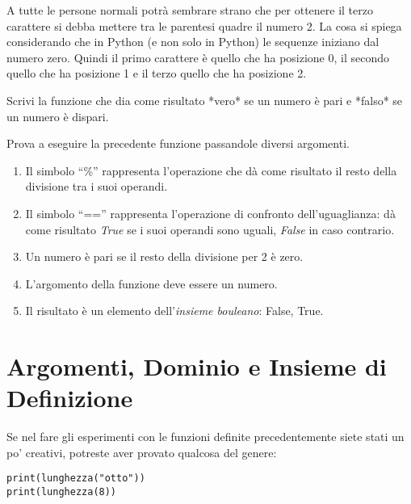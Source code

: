 \begin{osservazione}
 A tutte le persone normali potrà sembrare strano che per ottenere il 
terzo carattere si debba mettere tra le parentesi quadre il numero 2. 
La cosa si spiega considerando che in Python (e non solo in Python) le 
sequenze iniziano dal numero zero. Quindi il primo carattere è quello che 
ha posizione 0, il secondo quello che ha posizione 1 e il terzo quello che 
ha posizione 2.
\end{osservazione}

\begin{esempio}
Scrivi la funzione che dia come risultato *vero* se un numero è pari e 
*falso* se un numero è dispari.


Prova a eseguire la precedente funzione passandole diversi argomenti.
\end{esempio}

\begin{osservazione}
 \begin{enumerate} [nosep]
  \item Il simbolo ``\%'' rappresenta l'operazione che dà come risultato il 
resto della divisione tra i suoi operandi.
  \item Il simbolo ``=='' rappresenta l'operazione di confronto 
dell'uguaglianza: 
dà come risultato \emph{True} se i suoi operandi sono uguali, \emph{False} 
in caso contrario.
  \item Un numero è pari se il resto della divisione per 2 è zero.
  \item L'argomento della funzione deve essere un numero.
  \item Il risultato è un elemento dell'\emph{insieme bouleano}: {False, 
True}.
 \end{enumerate}
\end{osservazione}

\section{Argomenti, Dominio e Insieme di Definizione}
\label{sec:funzioni2_dominio}

Se nel fare gli esperimenti con le funzioni definite precedentemente siete 
stati un po' creativi, potreste aver provato qualcosa del genere:

\begin{lstlisting}
print(lunghezza("otto"))
print(lunghezza(8))
\end{lstlisting}

